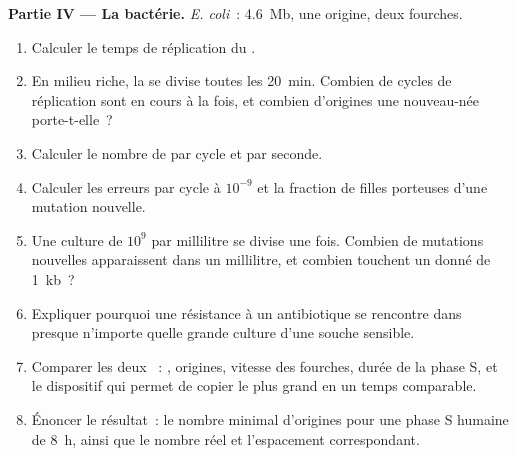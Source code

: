 \begin{problem}
\medskip
\noindent\textbf{Partie IV --- La bactérie.}
\emph{E. coli}~: \qty{4.6}{Mb}, une origine, deux fourches.
\begin{enumerate}[resume]
  \item Calculer le temps de réplication du .
  \item En milieu riche, la  se divise toutes les \qty{20}{min}.
        Combien de cycles de réplication sont en cours à la fois, et
        combien d'origines une  nouveau-née porte-t-elle~?
  \item Calculer le nombre de  par cycle et par
        seconde.
  \item Calculer les erreurs par cycle à $10^{-9}$ et la fraction de
         filles porteuses d'une mutation nouvelle.
  \item Une culture de $10^9$  par millilitre se divise une
        fois. Combien de mutations nouvelles apparaissent dans un
        millilitre, et combien touchent un  donné de \qty{1}{kb}~?
  \item Expliquer pourquoi une résistance à un antibiotique se rencontre
        dans presque n'importe quelle grande culture d'une souche
        sensible.
  \item Comparer les deux ~: , origines,
        vitesse des fourches, durée de la phase S, et le dispositif qui
        permet de copier le plus grand  en un temps comparable.
  \item Énoncer le résultat~: le nombre minimal d'origines pour une
        phase S humaine de \qty{8}{h}, ainsi que le nombre réel et
        l'espacement correspondant.
\end{enumerate}
\end{problem}
